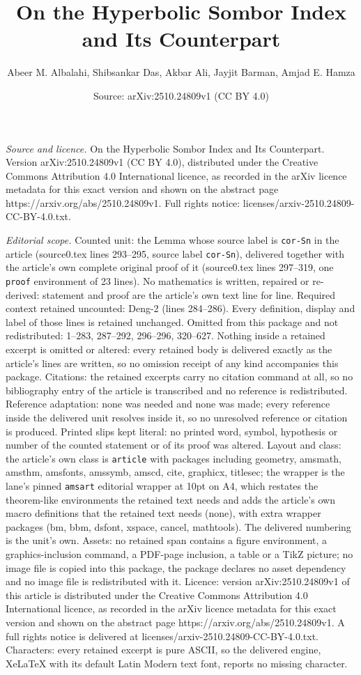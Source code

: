 \documentclass[10pt,a4paper]{amsart}
\title[On the Hyperbolic Sombor Index and Its Counterpart]{On the Hyperbolic Sombor Index and Its Counterpart}
\author{Abeer M. Albalahi, Shibsankar Das, Akbar Ali, Jayjit Barman, Amjad E. Hamza}
\date{Source: arXiv:2510.24809v1 (CC BY 4.0)}
\begin{document}
\maketitle

\noindent\emph{Source and licence.} On the Hyperbolic Sombor Index and Its Counterpart. Version arXiv:2510.24809v1 (CC BY 4.0), distributed under the Creative Commons Attribution 4.0 International licence, as recorded in the arXiv licence metadata for this exact version and shown on the abstract page https://arxiv.org/abs/2510.24809v1. Full rights notice: licenses/arxiv-2510.24809-CC-BY-4.0.txt.\par\smallskip

\noindent\textit{Editorial scope.} Counted unit: the Lemma whose source label is \texttt{cor-Sn} in the article (source0.tex lines 293--295, source label \texttt{cor-Sn}), delivered together with the article's own complete original proof of it (source0.tex lines 297--319, one \texttt{proof} environment of 23 lines). No mathematics is written, repaired or re-derived: statement and proof are the article's own text line for line. Required context retained uncounted: Deng-2 (lines 284--286). Every definition, display and label of those lines is retained unchanged. Omitted from this package and not redistributed: 1--283, 287--292, 296--296, 320--627. Nothing inside a retained excerpt is omitted or altered: every retained body is delivered exactly as the article's lines are written, so no omission receipt of any kind accompanies this package. Citations: the retained excerpts carry no citation command at all, so no bibliography entry of the article is transcribed and no reference is redistributed. Reference adaptation: none was needed and none was made; every reference inside the delivered unit resolves inside it, so no unresolved reference or citation is produced. Printed slips kept literal: no printed word, symbol, hypothesis or number of the counted statement or of its proof was altered. Layout and class: the article's own class is \texttt{article} with packages including geometry, amsmath, amsthm, amsfonts, amssymb, amscd, cite, graphicx, titlesec; the wrapper is the lane's pinned \texttt{amsart} editorial wrapper at 10pt on A4, which restates the theorem-like environments the retained text needs and adds the article's own macro definitions that the retained text needs (none), with extra wrapper packages (bm, bbm, dsfont, xspace, cancel, mathtools). The delivered numbering is the unit's own. Assets: no retained span contains a figure environment, a graphics-inclusion command, a PDF-page inclusion, a table or a TikZ picture; no image file is copied into this package, the package declares no asset dependency and no image file is redistributed with it. Licence: version arXiv:2510.24809v1 of this article is distributed under the Creative Commons Attribution 4.0 International licence, as recorded in the arXiv licence metadata for this exact version and shown on the abstract page https://arxiv.org/abs/2510.24809v1. A full rights notice is delivered at licenses/arxiv-2510.24809-CC-BY-4.0.txt. Characters: every retained excerpt is pure ASCII, so the delivered engine, XeLaTeX with its default Latin Modern text font, reports no missing character.
\end{document}
